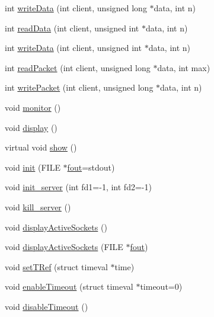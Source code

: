 \begin{DoxyCompactItemize}
\item 
int \hyperlink{classBaseServer_adf88b5234a4f4d8b628532d8c6414411}{write\-Data} (int client, unsigned long $\ast$data, int n)
\item 
int \hyperlink{classBaseServer_aa0d062a605ff448863f34289da258cfd}{read\-Data} (int client, unsigned int $\ast$data, int n)
\item 
int \hyperlink{classBaseServer_a8273745a09b80f9ab45dabdef43b783d}{write\-Data} (int client, unsigned int $\ast$data, int n)
\item 
int \hyperlink{classBaseServer_aa904ae62925129a82c11845ddda25aa2}{read\-Packet} (int client, unsigned long $\ast$data, int max)
\item 
int \hyperlink{classBaseServer_a93e4a6401e0b0937116feb9af915f2b0}{write\-Packet} (int client, unsigned long $\ast$data, int n)
\item 
void \hyperlink{classBaseServer_ac4ca7f212bdcba0d1fe485bc74f3010b}{monitor} ()
\item 
void \hyperlink{classBaseServer_aef1fa86f254fcb22d1c70541f32adca1}{display} ()
\item 
virtual void \hyperlink{classBaseServer_a80e40ca3d4c622aa85f199fe43b8803d}{show} ()
\item 
void \hyperlink{classBaseServer_a24c84f0313d09d3a3585b3dcaf7dccd9}{init} (F\-I\-L\-E $\ast$\hyperlink{classBaseServer_a9ad43261a042fbeeafee33ca4c0b3fd3}{fout}=stdout)
\item 
void \hyperlink{classBaseServer_aab359a913d5494d783178c7887f0e3ef}{init\-\_\-server} (int fd1=-\/1, int fd2=-\/1)
\item 
void \hyperlink{classBaseServer_a377c95f40422ee8c80f8344a0e90cb3a}{kill\-\_\-server} ()
\item 
void \hyperlink{classBaseServer_ae3172b36c67a4cfd5eac9770f9ea8172}{display\-Active\-Sockets} ()
\item 
void \hyperlink{classBaseServer_ae06367103d97f105e8cbb97ee81c8b83}{display\-Active\-Sockets} (F\-I\-L\-E $\ast$\hyperlink{classBaseServer_a9ad43261a042fbeeafee33ca4c0b3fd3}{fout})
\item 
void \hyperlink{classBaseServer_abfda17e7318193d8fc397f2bc67b6d0b}{set\-T\-Ref} (struct timeval $\ast$time)
\item 
void \hyperlink{classBaseServer_a61ab16b5f61c3f28e75ed57c2f56110e}{enable\-Timeout} (struct timeval $\ast$timeout=0)
\item 
void \hyperlink{classBaseServer_aff06d769604bc32179ea3adb54ccaefc}{disable\-Timeout} ()
\end{DoxyCompactItemize}
